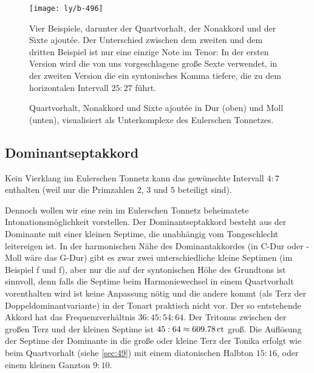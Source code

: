 \documentclass[ngerman,11pt]{scrartcl}
\begin{document}
\begin{figure}
  \centering
  \texttt{[image: ly/b-496]}
  \caption{Vier Beispiele, darunter der Quartvorhalt, der Nonakkord und der
  	Sixte ajoutée. Der Unterschied zwischen dem zweiten und dem dritten Beispiel
  	ist nur eine einzige Note im Tenor: In der ersten Version wird die von uns
  	vorgeschlagene große Sexte verwendet, in der zweiten Version die ein
  	syntonisches Komma tiefere, die zu dem horizontalen Intervall $25:27$
  	führt.}\label{fig:496}
\end{figure}

\begin{figure}
  \centering
  
  \caption{Quartvorhalt, Nonakkord und Sixte ajoutée in Dur
    (oben) und Moll (unten), visualisiert als Unterkomplexe des Eulerschen
    Tonnetzes.}\label{fig:chordLines}
\end{figure}

\subsection{Dominantseptakkord}

Kein Vierklang im Eulerschen Tonnetz kann das gewünschte Intervall $4:7$
enthalten (weil nur die Primzahlen $2$, $3$ und $5$ beteiligt
sind).

Dennoch wollen wir eine rein im Eulerschen Tonnetz beheimatete
Intonationsmöglichkeit vorstellen. Der Dominantseptakkord besteht aus der
Dominante mit einer kleinen Septime, die unabhängig vom Tongeschlecht
leitereigen ist. In der harmonischen Nähe des Dominantakkordes (in C-Dur oder
-Moll wäre das G-Dur) gibt es zwar zwei unterschiedliche kleine Septimen (im
Beispiel \natural f und \naturalp f), aber nur die auf der syntonischen Höhe
des Grundtons ist sinnvoll, denn falls die Septime beim Harmoniewechsel in
einem Quartvorhalt vorenthalten wird ist keine Anpassung nötig und die andere
kommt (als Terz der Doppeldominantvariante) in der Tonart praktisch nicht vor.
Der so entstehende Akkord hat das Frequenzverhältnis $36:45:54:64$. Der Tritonus
zwischen der großen Terz und der kleinen Septime ist
$45:64\approx 609.78\,\mathrm{ct}$ groß. Die Auflösung der Septime der Dominante in
die große oder kleine Terz der Tonika erfolgt wie beim Quartvorhalt (siehe
\cref{sec:49}) mit einem diatonischen Halbton $15:16$, oder einem kleinen
Ganzton $9:10$.
\end{document}
